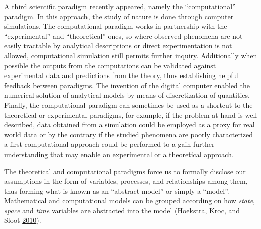 \documentclass[
  12pt,
  openany]{book}
\begin{document}
A third scientific paradigm recently appeared, namely the ``computational'' paradigm. In this approach, the study of nature is done through computer simulations. The computational paradigm works in partnership with the ``experimental'' and ``theoretical'' ones, so where observed phenomena are not easily tractable by analytical descriptions or direct experimentation is not allowed, computational simulation still permits further inquiry. Additionally when possible the outputs from the computations can be validated against experimental data and predictions from the theory, thus establishing helpful feedback between paradigms. The invention of the digital computer enabled the numerical solution of analytical models by means of discretization of quantities. Finally, the computational paradigm can sometimes be used as a shortcut to the theoretical or experimental paradigms, for example, if the problem at hand is well described, data obtained from a simulation could be employed as a proxy for real world data or by the contrary if the studied phenomena are poorly characterized a first computational approach could be performed to a gain further understanding that may enable an experimental or a theoretical approach.

The theoretical and computational paradigms force us to formally disclose our assumptions in the form of variables, processes, and relationships among them, thus forming what is known as an ``abstract model'' or simply a ``model''. Mathematical and computational models can be grouped according on how \emph{state}, \emph{space} and \emph{time} variables are abstracted into the model (Hoekstra, Kroc, and Sloot \protect\hyperlink{ref-hoekstra2010simulating}{2010}).
\end{document}
